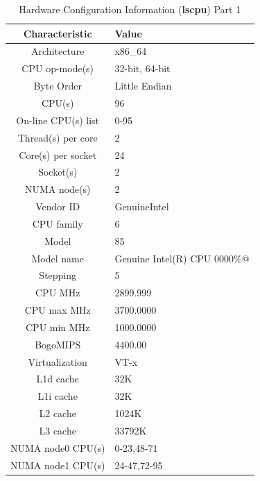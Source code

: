 \begin{table}
    \caption{Hardware Configuration Information (\textbf{lscpu}) Part 1}\label{table:results:hardware}
    \begin{tabular}{@{}cl@{}}
        Characteristic & Value  \\ \toprule
        Architecture &  x86\_64 \\
        CPU op-mode(s)&      32-bit, 64-bit \\
        Byte Order&          Little Endian \\
        CPU(s)&              96 \\
        On-line CPU(s) list& 0-95 \\
        Thread(s) per core&  2 \\
        Core(s) per socket&  24 \\
        Socket(s)&           2 \\
        NUMA node(s)&        2 \\
        Vendor ID&           GenuineIntel \\
        CPU family&          6 \\ 
        Model&               85 \\ 
        Model name&          Genuine Intel(R) CPU 0000\%@ \\
        Stepping&            5 \\
        CPU MHz&             2899.999 \\
        CPU max MHz&         3700.0000 \\
        CPU min MHz&         1000.0000 \\
        BogoMIPS&            4400.00 \\
        Virtualization&      VT-x \\
        L1d cache&           32K \\
        L1i cache&           32K \\
        L2 cache&            1024K \\
        L3 cache&            33792K \\
        NUMA node0 CPU(s)&   0-23,48-71 \\
        NUMA node1 CPU(s)&   24-47,72-95 \\
        \bottomrule
    \end{tabular}%
\end{table}

